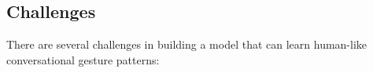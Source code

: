 %	
%		
%	
%	
%	


\subsection{Challenges}
\label{sec:difficult}

There are several challenges in building a model that can learn human-like conversational gesture patterns:

